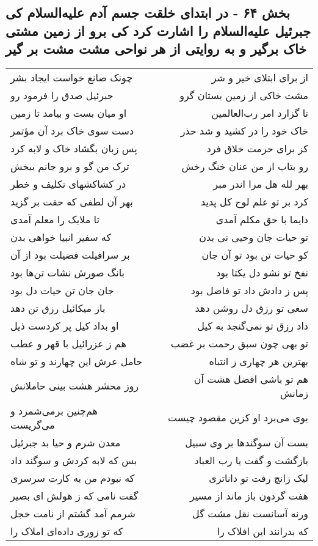 \begin{center}
\section*{بخش ۶۴ - در ابتدای خلقت جسم آدم علیه‌السلام  کی جبرئیل علیه‌السلام را اشارت کرد کی برو از زمین مشتی خاک برگیر و به روایتی از هر نواحی مشت مشت بر گیر}
\label{sec:sh064}
\begin{longtable}{l p{0.5cm} r}
چونک صانع خواست ایجاد بشر
&&
از برای ابتلای خیر و شر
\\
جبرئیل صدق را فرمود رو
&&
مشت خاکی از زمین بستان گرو
\\
او میان بست و بیامد تا زمین
&&
تا گزارد امر رب‌العالمین
\\
دست سوی خاک برد آن مؤتمر
&&
خاک خود را در کشید و شد حذر
\\
پس زبان بگشاد خاک و لابه کرد
&&
کز برای حرمت خلاق فرد
\\
ترک من گو و برو جانم ببخش
&&
رو بتاب از من عنان خنگ رخش
\\
در کشاکشهای تکلیف و خطر
&&
بهر لله هل مرا اندر مبر
\\
بهر آن لطفی که حقت بر گزید
&&
کرد بر تو علم لوح کل پدید
\\
تا ملایک را معلم آمدی
&&
دایما با حق مکلم آمدی
\\
که سفیر انبیا خواهی بدن
&&
تو حیات جان وحیی نی بدن
\\
بر سرافیلت فضیلت بود از آن
&&
کو حیات تن بود تو آن جان
\\
بانگ صورش نشات تن‌ها بود
&&
نفخ تو نشو دل یکتا بود
\\
جان جان تن حیات دل بود
&&
پس ز دادش داد تو فاضل بود
\\
باز میکائیل رزق تن دهد
&&
سعی تو رزق دل روشن دهد
\\
او بداد کیل پر کردست ذیل
&&
داد رزق تو نمی‌گنجد به کیل
\\
هم ز عزرائیل با قهر و عطب
&&
تو بهی چون سبق رحمت بر غضب
\\
حامل عرش این چهارند و تو شاه
&&
بهترین هر چهاری ز انتباه
\\
روز محشر هشت بینی حاملانش
&&
هم تو باشی افضل هشت آن زمانش
\\
هم‌چنین برمی‌شمرد و می‌گریست
&&
بوی می‌برد او کزین مقصود چیست
\\
معدن شرم و حیا بد جبرئیل
&&
بست آن سوگندها بر وی سبیل
\\
بس که لابه کردش و سوگند داد
&&
بازگشت و گفت یا رب العباد
\\
که نبودم من به کارت سرسری
&&
لیک زانچ رفت تو داناتری
\\
گفت نامی که ز هولش ای بصیر
&&
هفت گردون باز ماند از مسیر
\\
شرمم آمد گشتم از نامت خجل
&&
ورنه آسانست نقل مشت گل
\\
که تو زوری داده‌ای املاک را
&&
که بدرانند این افلاک را
\\
\end{longtable}
\end{center}
